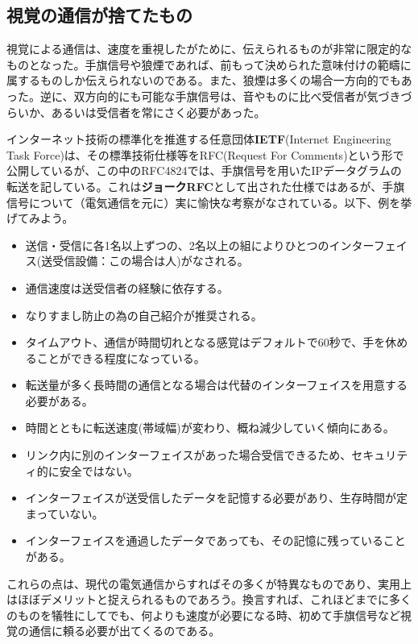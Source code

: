 \subsection{視覚の通信が捨てたもの}

視覚による通信は、速度を重視したがために、伝えられるものが非常に限定的なものとなった。手旗信号や狼煙であれば、前もって決められた意味付けの範疇に属するものしか伝えられないのである。また、狼煙は多くの場合一方向的でもあった。逆に、双方向的にも可能な手旗信号は、音やものに比べ受信者が気づきづらいか、あるいは受信者を常にさく必要があった。

インターネット技術の標準化を推進する任意団体\textbf{IETF}(Internet Engineering Task Force)は、その標準技術仕様等をRFC(Request For Comments)という形で公開しているが、この中のRFC4824では、手旗信号を用いたIPデータグラムの転送を記している。これは\textbf{ジョークRFC}として出された仕様ではあるが、手旗信号について（電気通信を元に）実に愉快な考察がなされている。以下、例を挙げてみよう。
\begin{itemize}
\item 送信・受信に各1名以上ずつの、2名以上の組によりひとつのインターフェイス(送受信設備：この場合は人)がなされる。
\item 通信速度は送受信者の経験に依存する。
\item なりすまし防止の為の自己紹介が推奨される。
\item タイムアウト、通信が時間切れとなる感覚はデフォルトで60秒で、手を休めることができる程度になっている。
\item 転送量が多く長時間の通信となる場合は代替のインターフェイスを用意する必要がある。
\item 時間とともに転送速度(帯域幅)が変わり、概ね減少していく傾向にある。
\item リンク内に別のインターフェイスがあった場合受信できるため、セキュリティ的に安全ではない。
\item インターフェイスが送受信したデータを記憶する必要があり、生存時間が定まっていない。
\item インターフェイスを通過したデータであっても、その記憶に残っていることがある。
\end{itemize}
これらの点は、現代の電気通信からすればその多くが特異なものであり、実用上はほぼデメリットと捉えられるものであろう。換言すれば、これほどまでに多くのものを犠牲にしてでも、何よりも速度が必要になる時、初めて手旗信号など視覚の通信に頼る必要が出てくるのである。


